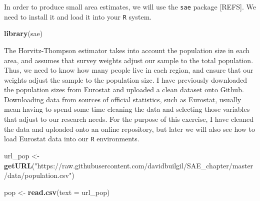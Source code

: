\documentclass[
]{article}
\newenvironment{Shaded}{\begin{snugshade}}{\end{snugshade}}
\newcommand{\CommentTok}[1]{\textcolor[rgb]{0.56,0.35,0.01}{\textit{#1}}}
\newcommand{\DataTypeTok}[1]{\textcolor[rgb]{0.13,0.29,0.53}{#1}}
\newcommand{\DecValTok}[1]{\textcolor[rgb]{0.00,0.00,0.81}{#1}}
\newcommand{\KeywordTok}[1]{\textcolor[rgb]{0.13,0.29,0.53}{\textbf{#1}}}
\newcommand{\NormalTok}[1]{#1}
\newcommand{\OperatorTok}[1]{\textcolor[rgb]{0.81,0.36,0.00}{\textbf{#1}}}
\newcommand{\StringTok}[1]{\textcolor[rgb]{0.31,0.60,0.02}{#1}}
\begin{document}
In order to produce small area estimates, we will use the \texttt{sae}
package {[}REFS{]}. We need to install it and load it into your
\texttt{R} system.

\begin{Shaded}
\begin{Highlighting}[]
\KeywordTok{library}\NormalTok{(sae)}
\end{Highlighting}
\end{Shaded}

The Horvitz-Thompson estimator takes into account the population size in
each area, and assumes that survey weights adjust our sample to the
total population. Thus, we need to know how many people live in each
region, and ensure that our weights adjust the sample to the population
size. I have previously downloaded the population sizes from Eurostat
and uploaded a clean dataset onto Github. Downloading data from sources
of official statistics, such as Eurostat, usually mean having to spend
some time cleaning the data and selecting those variables that adjust to
our research needs. For the purpose of this exercise, I have cleaned the
data and uploaded onto an online repository, but later we will also see
how to load Eurostat data into our \texttt{R} environments.

\begin{Shaded}
\begin{Highlighting}[]
\NormalTok{url_pop <-}\StringTok{ }\KeywordTok{getURL}\NormalTok{(}\StringTok{"https://raw.githubusercontent.com/davidbuilgil/SAE_chapter/master/data/population.csv"}\NormalTok{)}

\NormalTok{pop <-}\StringTok{ }\KeywordTok{read.csv}\NormalTok{(}\DataTypeTok{text =}\NormalTok{ url_pop)}
\end{Highlighting}
\end{Shaded}

\begin{Shaded}
\end{Shaded}
\end{document}
